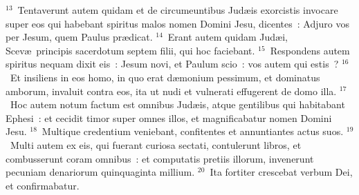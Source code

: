 ${}^{13}$~Tentaverunt autem quidam et de circumeuntibus Jud\ae is exorcistis invocare super eos qui habebant spiritus malos nomen Domini Jesu, dicentes~: Adjuro vos per Jesum, quem Paulus pr\ae dicat.
${}^{14}$~Erant autem quidam Jud\ae i, Scev\ae\ principis sacerdotum septem filii, qui hoc faciebant.
${}^{15}$~Respondens autem spiritus nequam dixit eis~: Jesum novi, et Paulum scio~: vos autem qui estis~?
${}^{16}$~Et insiliens in eos homo, in quo erat d\ae monium pessimum, et dominatus amborum, invaluit contra eos, ita ut nudi et vulnerati effugerent de domo illa.
${}^{17}$~Hoc autem notum factum est omnibus Jud\ae is, atque gentilibus qui habitabant Ephesi~: et cecidit timor super omnes illos, et magnificabatur nomen Domini Jesu.
${}^{18}$~Multique credentium veniebant, confitentes et annuntiantes actus suos.
${}^{19}$~Multi autem ex eis, qui fuerant curiosa sectati, contulerunt libros, et combusserunt coram omnibus~: et computatis pretiis illorum, invenerunt pecuniam denariorum quinquaginta millium.
${}^{20}$~Ita fortiter crescebat verbum Dei, et confirmabatur.


